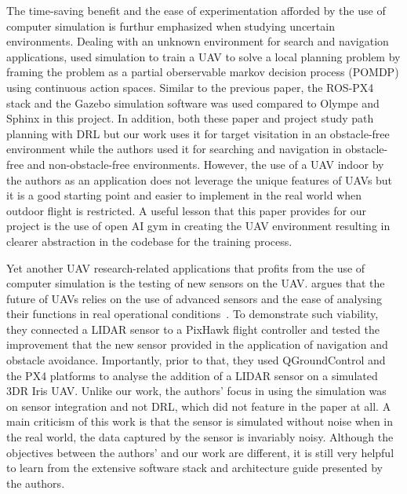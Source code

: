 \documentclass[../main.tex]{subfiles}
\begin{document}

The time-saving benefit and the ease of experimentation 
afforded by the use of computer simulation is furthur emphasized 
when studying uncertain environments.
Dealing with an unknown environment for search and navigation applications,
\citeauthor{Wal19} used simulation to train a UAV 
to solve a local planning problem
by framing the problem as a 
partial oberservable markov decision process (POMDP)
using continuous action spaces.
Similar to the previous paper, the ROS-PX4 stack and the Gazebo 
simulation software was used compared to Olympe and Sphinx 
in this project.
In addition, both these paper and project study path planning 
with DRL but our work uses it for target visitation 
in an obstacle-free environment 
while the authors used it for searching and navigation
in obstacle-free and non-obstacle-free environments.
However, the use of a UAV indoor by the authors as an application 
does not leverage the unique features of UAVs 
but it is a good starting point 
and easier to implement in the real world 
when outdoor flight is restricted.
A useful lesson that this paper provides for our project
is the use of open AI gym in creating the UAV environment
resulting in clearer abstraction in the codebase
for the training process.

Yet another UAV research-related applications 
that profits from the use of computer simulation 
is the testing of new sensors on the UAV.
\citeauthor{Gar20} argues that the future of UAVs
relies on the use of advanced sensors and 
the ease of analysing their functions
in real operational conditions~\cite{Gar20}.
To demonstrate such viability, they connected a LIDAR sensor
to a PixHawk flight controller and tested the improvement
that the new sensor provided
in the application of navigation and obstacle avoidance.
Importantly, prior to that, they used QGroundControl and the PX4
platforms to analyse the addition of a LIDAR sensor
on a simulated 3DR Iris UAV.
Unlike our work, the authors' focus in using the simulation
was on sensor integration and not DRL, 
which did not feature in the paper at all. 
A main criticism of this work is that 
the sensor is simulated without noise
when in the real world, the data captured
by the sensor is invariably noisy.
Although the objectives between the authors' and our work
are different, it is still very helpful to learn from
the extensive software stack and architecture guide 
presented by the authors.



\blindtext
\end{document}
